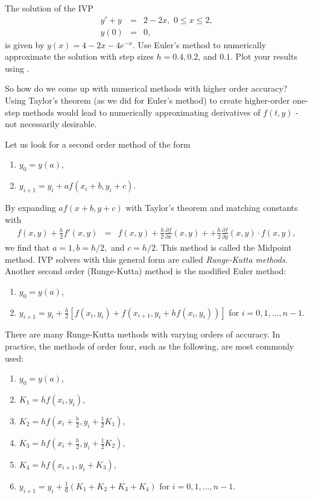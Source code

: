 \begin{problem}
The solution of the IVP
\begin{eqnarray*}
y' + y &=& 2-2x,\,\, 0 \leq x \leq 2, \\
y(0) &=& 0,
\end{eqnarray*}
is given by $y(x) = 4-2x -4e^{-x}$. Use Euler's method to numerically approximate the solution
with step sizes $h = 0.4, 0.2$, and $0.1.$ Plot your results using .
\end{problem}



So how do we come up with numerical methods with higher order accuracy? Using Taylor's theorem (as we did for Euler's method) to create higher-order one-step methods would lead to numerically approximating derivatives of $f(t,y)$ - not necessarily desirable. 

Let us look for a second order method of the form 
\begin{enumerate}
\item $y_0 = y(a)$,
\item $y_{i+1} = y_i + a f(x_i+b, y_i+c)$.
\end{enumerate}
By expanding $a f(x+b, y+c)$ with Taylor's theorem and matching constants with 
\begin{eqnarray*}
f(x,y) + \frac{h}{2}f'(x,y) &=& f(x,y) + \frac{h}{2}\frac{\partial f}{\partial x}(x,y) +  + \frac{h}{2}\frac{\partial f}{\partial y}(x,y) \cdot f(x,y),
\end{eqnarray*}
we find that $a = 1, b = h/2,$ and $c = h/2$. This method is called the Midpoint method. IVP solvers with this general form are called \textit{Runge-Kutta methods}. Another second order (Runge-Kutta) method is the modified Euler method: 
\begin{enumerate}
\item $y_0 = y(a)$,
\item $y_{i+1} = y_i + \frac{h}{2}[ f(x_i, y_i) + f(x_{i+1}, y_i+ hf(x_i, y_i))]$ for $i = 0,1,\hdots, n-1$. 
\end{enumerate}

There are many Runge-Kutta methods with varying orders of accuracy. In practice, the methods of order four, such as the following, are most commonly used: 
\begin{enumerate}
\item $y_0 = y(a)$, 
\item $K_1 = hf(x_i,y_i)$,
\item $K_2 = hf(x_i + \frac{h}{2}, y_i + \frac{1}{2} K_1),$
\item $K_3 = hf(x_i + \frac{h}{2} , y_i + \frac{1}{2} K_2),$
\item $K_4 = hf(x_{i+1} , y_i +  K_3),$
\item $y_{i+1} = y_i + \frac{1}{6}(K_1 + K_2 + K_3 + K_4)$ for $i = 0,1,\hdots,n-1$.
\end{enumerate}




